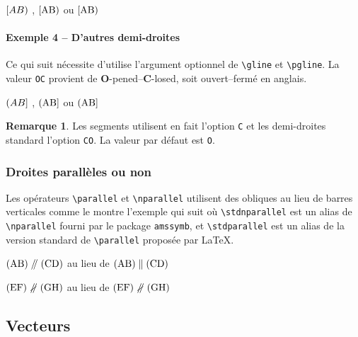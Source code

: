 \documentclass[12pt,a4paper]{article}
\newcommand\env[1]{\texttt{#1}}
\newcommand\macro[1]{\env{\textbackslash{}#1}}
\theoremstyle{definition}
\newtheorem*{remark}{Remarque}
\begin{document}
\begin{latexex}
$\hgline{A}{B}$ ,
$\hgline{\pt{A}}{\pt{B}}$ ou
$\phgline{A}{B}$
\end{latexex}




\paragraph{Exemple 4 -- D'autres demi-droites}

Ce qui suit nécessite d'utilise l'argument optionnel de \macro{gline} et \macro{pgline}. La valeur \verb+OC+ provient de \textbf{O}-pened--\textbf{C}-losed, soit ouvert--fermé en anglais.

\begin{latexex}
$\gline[OC]{A}{B}$ ,
$\gline[OC]{\pt{A}}{\pt{B}}$ ou
$\pgline[OC]{A}{B}$
\end{latexex}


\begin{remark}
	Les segments utilisent en fait l'option \verb+C+ et les demi-droites standard l'option \verb+CO+.
	La valeur par défaut est \verb+O+.
\end{remark}




\subsubsection{Droites parallèles ou non}

Les opérateurs \macro{parallel} et \macro{nparallel} utilisent des obliques au lieu de barres verticales comme le montre l'exemple qui suit où \macro{stdnparallel} est un alias de \macro{nparallel} fourni par le package \verb+amssymb+, et \macro{stdparallel} est un alias de la version standard de \macro{parallel} proposée par \LaTeX{}.

\begin{latexex}
$\pgline{A}{B} \parallel \pgline{C}{D}$
au lieu de
$\pgline{A}{B}
 \stdparallel \pgline{C}{D}$

$\pgline{E}{F} \nparallel \pgline{G}{H}$
au lieu de
$\pgline{E}{F}
 \stdnparallel \pgline{G}{H}$
\end{latexex}



\subsection{Vecteurs}
\end{document}
